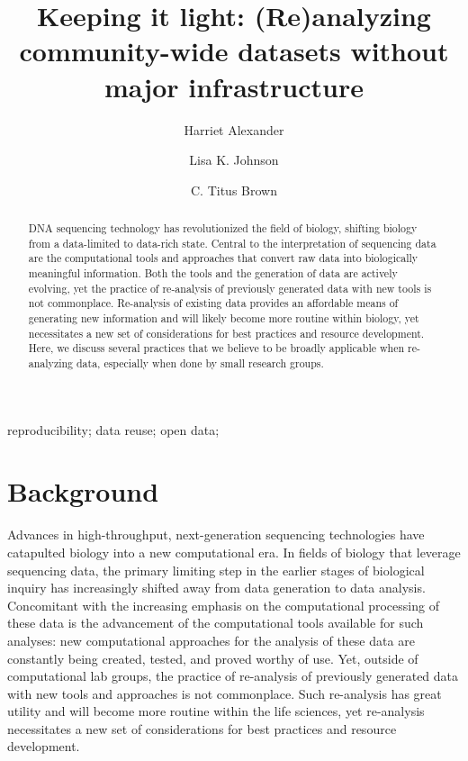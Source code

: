 \documentclass[a4paper,num-refs]{oup-contemporary}
\title{Keeping it light: (Re)analyzing community-wide datasets without major infrastructure}
\author[1]{Harriet Alexander}
\author[1,2]{Lisa K. Johnson}
\author[1,\authfn{1}]{C. Titus Brown}
\affil[1]{Population Health and Reproduction, University of California, Davis, CA, USA}
\affil[2]{Molecular, Cellular, and Integrative Physiology Graduate Group, University of California, Davis, CA, USA}
\begin{document}
\begin{frontmatter}
\maketitle

  \begin{abstract}
    DNA sequencing technology has revolutionized the field of biology, shifting biology from a data-limited to data-rich state. Central to the interpretation of sequencing data are the computational tools and approaches that convert raw data into biologically meaningful information. Both the tools and the generation of data are actively evolving, yet the practice of re-analysis of previously generated data with new tools is not commonplace. Re-analysis of existing data provides an affordable means of generating new information and will likely become more routine within biology, yet necessitates a new set of considerations for best practices and resource development. Here, we discuss several practices that we believe to be broadly applicable when re-analyzing data, especially when done by small research groups.

  \end{abstract}

\begin{keywords}
reproducibility; data reuse; open data;
\end{keywords}
\end{frontmatter}

\section{Background}
Advances in high-throughput, next-generation sequencing technologies have catapulted biology into a new computational era. In fields of biology that leverage sequencing data, the primary limiting step in the earlier stages of biological inquiry has increasingly shifted away from data generation to data analysis. Concomitant with the increasing emphasis on the computational processing of these data is the advancement of the computational tools available for such analyses: new computational approaches for the analysis of these data are constantly being created, tested, and proved worthy of use. Yet, outside of computational lab groups, the practice of re-analysis of previously generated data with new tools and approaches is not commonplace. Such re-analysis has great utility and will become more routine within the life sciences, yet re-analysis necessitates a new set of considerations for best practices and resource development.
\end{document}
